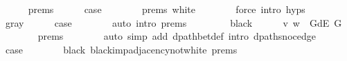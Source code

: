 \begin{isabellebody}
\ \ \ \ \isamarkupfalse%
\ {\isachardoublequoteopen}{}{\isachardot}{\kern0pt}prems{\isachardoublequoteclose}{\isacharparenleft}{\kern0pt}{}{\isacharparenright}{\kern0pt}\isanewline
\ \ \ \ \isamarkupfalse%
\ {\isacharquery}{\kern0pt}case\isanewline
\ \ \ \ \ \ \isamarkupfalse%
\ {\isachardoublequoteopen}{}{\isachardot}{\kern0pt}prems{\isachardoublequoteclose}{\isacharparenleft}{\kern0pt}{}{\isacharparenright}{\kern0pt}\ white\isanewline
\ \ \ \ \ \ \isamarkupfalse%
\ {\isacharparenleft}{\kern0pt}force\ intro{\isacharcolon}{\kern0pt}\ {\isachardoublequoteopen}{}{\isachardot}{\kern0pt}hyps{\isachardoublequoteclose}{\isacharparenright}{\kern0pt}\isanewline
\ \ \isamarkupfalse%
\isanewline
\ \ \ \ \isamarkupfalse%
\ gray\isanewline
\ \ \ \ \isamarkupfalse%
\ {\isacharquery}{\kern0pt}case\isanewline
\ \ \ \ \ \ \isamarkupfalse%
\ {\isacharparenleft}{\kern0pt}auto\ intro{\isacharcolon}{\kern0pt}\ {\isachardoublequoteopen}{}{\isachardot}{\kern0pt}prems{\isachardoublequoteclose}{\isacharparenleft}{\kern0pt}{}{\isacharparenright}{\kern0pt}{\isacharparenright}{\kern0pt}\isanewline
\ \ \isamarkupfalse%
\isanewline
\ \ \ \ \isamarkupfalse%
\ black\isanewline
\ \ \ \ \isamarkupfalse%
\ {\isachardoublequoteopen}{\isacharparenleft}{\kern0pt}v{\isacharcomma}{\kern0pt}\ w{\isacharparenright}{\kern0pt}\ {\isasymin}\ G{\isachardot}{\kern0pt}dE\ G{\isachardoublequoteclose}\isanewline
\ \ \ \ \ \ \isamarkupfalse%
\ {\isachardoublequoteopen}{}{\isachardot}{\kern0pt}prems{\isachardoublequoteclose}{\isacharparenleft}{\kern0pt}{}{\isacharparenright}{\kern0pt}\isanewline
\ \ \ \ \ \ \isamarkupfalse%
\ {\isacharparenleft}{\kern0pt}auto\ simp\ add{\isacharcolon}{\kern0pt}\ dpath{\isacharunderscore}{\kern0pt}bet{\isacharunderscore}{\kern0pt}def\ intro{\isacharcolon}{\kern0pt}\ dpath{\isacharunderscore}{\kern0pt}snoc{\isacharunderscore}{\kern0pt}edge{\isacharunderscore}{\kern0pt}{}{\isacharparenright}{\kern0pt}\isanewline
\ \ \ \ \isamarkupfalse%
\ {\isacharquery}{\kern0pt}case\isanewline
\ \ \ \ \ \ \isamarkupfalse%
\ black\ black{\isacharunderscore}{\kern0pt}imp{\isacharunderscore}{\kern0pt}adjacency{\isacharunderscore}{\kern0pt}not{\isacharunderscore}{\kern0pt}white\ {\isachardoublequoteopen}{}{\isachardot}{\kern0pt}prems{\isachardoublequoteclose}{\isacharparenleft}{\kern0pt}{}{\isacharparenright}{\kern0pt}\isanewline

\end{isabellebody}
